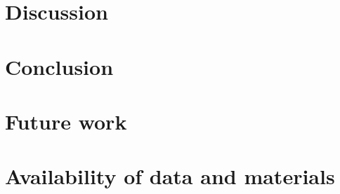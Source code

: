 \section{Discussion}
\section{Conclusion}

\section{Future work}

\section{Availability of data and materials}